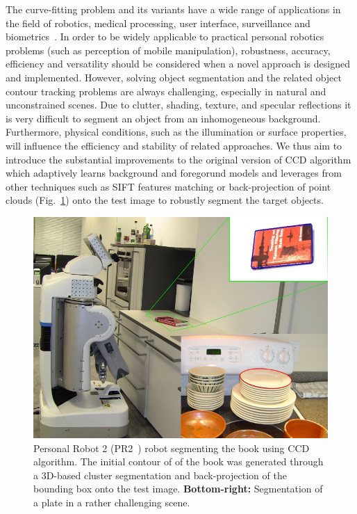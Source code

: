 \documentclass[conference]{IEEEtran}
\begin{document}
The curve-fitting problem and its variants have a wide range of
applications in the field of robotics, medical processing, user
interface, surveillance and biometrics~\cite{hanek2004fitting}. In order to be
widely applicable to practical personal robotics problems (such as
perception of mobile manipulation), robustness,
accuracy, efficiency and versatility should be
considered when a novel approach is designed and implemented.
However, solving object segmentation and the
related object contour tracking problems are always challenging,
especially in natural and unconstrained scenes. Due to clutter,
shading, texture, and specular reflections it is very difficult to segment
an object from an inhomogeneous background. Furthermore, physical
conditions, such as the illumination or surface properties, will
influence the efficiency and stability of related approaches. 
We thus aim to introduce the substantial improvements to the original
version of CCD algorithm which adaptively learns background and 
foregorund models and leverages from other techniques such as
SIFT features matching or back-projection of point clouds (Fig.~\ref{fig:divide}) 
onto the test image to robustly segment the target objects.

\begin{figure}[htbp]
  \centering
  \includegraphics[width=\columnwidth]{teaser.jpg}
  \caption{Personal Robot 2 (PR2~\cite{Wyrobek08PR1}) robot segmenting the book using CCD algorithm. 
    The initial contour of of the book was generated through a 3D-based cluster segmentation
    and back-projection of the bounding box onto the test image.
    \textbf{Bottom-right:} Segmentation of a plate in a rather
  challenging scene.}
  \label{fig:divide}
\end{figure}
\end{document}
